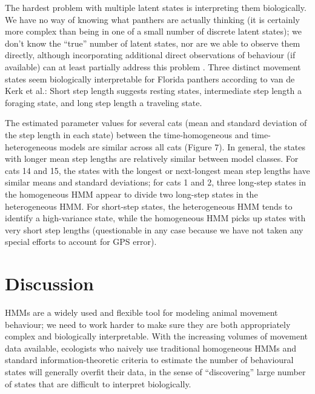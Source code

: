 \documentclass{bmcart}
\begin{document}
The hardest problem with multiple latent states is interpreting them
biologically. We have no way of knowing what panthers are actually
thinking (it is certainly more complex than being in one of a small
number of discrete latent states); 
we don't know the ``true'' number of latent states,
nor are we able to observe them directly, although
incorporating additional direct observations of 
behaviour (if available) can at least partially
address this problem \cite{fryxell_multiple_2008}.
Three distinct
movement states seem biologically interpretable for Florida panthers
according to van de Kerk et al.\cite{kerk2015hidden}: Short step length suggests resting
states, intermediate step length a foraging state, and long
step length a traveling state. 


The estimated parameter values
for several cats
(mean and standard deviation of the step length in each state) between
the time-homogeneous and time-heterogeneous models are similar across all cats (Figure 7). 
In general, the states with longer mean step lengths are relatively
similar between model classes. For cats 14 and 15, the states with
the longest or next-longest mean step lengths have similar means
and standard deviations; for cats 1 and 2, three long-step states
in the homogeneous HMM appear to divide two long-step states in 
the heterogeneous HMM. For short-step states, the heterogeneous HMM
tends to identify a high-variance state, while the homogeneous HMM
picks up states with very short step lengths (questionable in any
case because we have not taken any special efforts to account for
GPS error).

\section*{Discussion}

HMMs are a widely used and flexible tool for modeling animal movement
behaviour; we need to work harder to make sure they are both appropriately
complex and biologically interpretable. 
With the increasing volumes of movement data available,
ecologists who naively use traditional homogeneous HMMs
and standard information-theoretic criteria
to estimate the number of behavioural states will generally
overfit their data, in the sense of ``discovering'' large
number of states that are difficult to interpret biologically.
\end{document}
